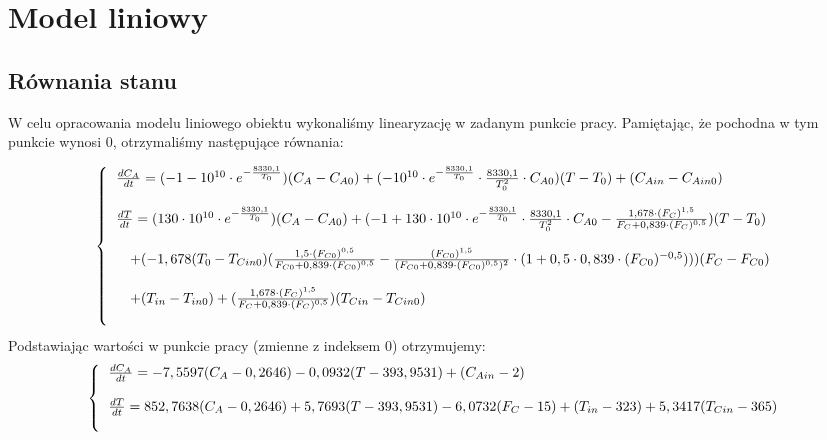 \chapter{Model liniowy}
\section{Równania stanu}
W celu opracowania modelu liniowego obiektu wykonaliśmy linearyzację w zadanym punkcie pracy. Pamiętając, że pochodna w tym punkcie wynosi 0, otrzymaliśmy następujące równania:

\begin{equation}
\left\{
\begin{tabular}{l}
$\frac{dC_A}{dt} = (-1-10^{10}\cdot e^{-\frac{8330,1}{T_0}})(C_A-C_{A0})+(-10^{10}\cdot e^{-\frac{8330,1}{T_0}}\cdot \frac{8330,1}{T_0^2}\cdot C_{A0})(T-T_0)+(C_{Ain}-C_{Ain0})$\\\\
$\frac{dT}{dt} = (130\cdot 10^{10}\cdot e^{-\frac{8330,1}{T_0}})(C_A-C_{A0}) + (-1+130\cdot 10^{10}\cdot e^{-\frac{8330,1}{T_0}}\cdot \frac{8330,1}{T_0^2}\cdot C_{A0}-\frac{1,678\cdot (F_C)^{1,5}}{F_C+0,839\cdot (F_C)^{0,5}})(T-T_0)$\\\\
$\quad + (-1,678(T_0-T_{Cin0})(\frac{1,5\cdot (F_{C0})^{0,5}}{F_{C0}+0,839\cdot (F_{C0})^{0,5}}-\frac{ (F_{C0})^{1,5}}{(F_{C0}+0,839\cdot (F_{C0})^{0,5})^2}\cdot (1+0,5\cdot 0,839 \cdot (F_{C0})^{-0,5})))(F_C-F_{C0})$\\\\
$\quad + (T_{in} - T_{in0}) + (\frac{1,678\cdot (F_C)^{1,5}}{F_C+0,839\cdot (F_C)^{0,5}})(T_{Cin} - T_{Cin0})$\\\\
\end{tabular}
\right.
\end{equation}
Podstawiając wartości w punkcie pracy (zmienne z indeksem 0) otrzymujemy:
\begin{equation}
\left\{
\begin{tabular}{l}
$\frac{dC_A}{dt} = -7,5597(C_A-0,2646)-0,0932(T-393,9531)+(C_{Ain}-2)$\\\\
$\frac{dT}{dt} = 852,7638(C_A-0,2646) + 5,7693(T-393,9531) -6,0732(F_C-15) + (T_{in} - 323) + 5,3417(T_{Cin} - 365)$\\\\
\end{tabular}
\right.
\end{equation}

